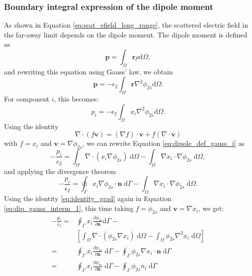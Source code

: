 \subsubsection{Boundary integral expression of the dipole moment}

As shown in Equation \eqref{eq:scat_efield_long_range}, the scattered electric 
field in the far-away limit depends on the dipole moment. The dipole moment is 
defined as 
%
\begin{equation} \label{eq:dipole_def}
\mathbf{p} = \int_\Omega \mathbf{r} \rho \text{d}\Omega,
\end{equation}
%
and rewriting this equation using Gauss' law, we obtain
%
\begin{equation} \label{eq:dipole_def_gauss}
\mathbf{p} = -\epsilon_2\int_\Omega \mathbf{r} \nabla^2 \phi_{2s} \text{d}\Omega.
\end{equation}
%
For component $i$, this becomes:
%
\begin{equation} \label{eq:dipole_def_gauss_i}
{p_i} = -\epsilon_2\int_\Omega {x_i} \nabla^2 \phi_{2s} \text{d}\Omega.
\end{equation}
%
Using the identity
%
\begin{equation} \label{eq:identity_grad}
  \nabla \cdot \left(f \mathbf{v}\right) = \left( \nabla f \right)\cdot \mathbf{v} + f\left(\nabla \cdot \mathbf{v}\right)
\end{equation}
%
with $f=x_i$ and $\mathbf{v} = \nabla\phi_{2s}$, we can rewrite Equation \eqref{eq:dipole_def_gauss_i}
as 
%
\begin{equation}
- \frac{p_i}{\epsilon_2} = \int_\Omega \nabla \cdot \left( x_i \nabla \phi_{2s} \right) \; \text{d}\Omega - \int_\Omega \nabla x_i \cdot \nabla\phi_{2s} \; \text{d}\Omega, \nonumber 
\end{equation}
\noindent and applying the divergence theorem
\begin{equation} \label{eq:dip_gauss_interm_1}
- \frac{p_i}{\epsilon_2}= \oint_\Gamma  x_i  \nabla \phi_{2s} \cdot \mathbf{n} \; \text{d}\Gamma - \int_\Omega \nabla x_i \cdot \nabla\phi_{2s} \; \text{d}\Omega.
\end{equation}
%
Using the identity \eqref{eq:identity_grad} again in Equation \eqref{eq:dip_gauss_interm_1}, this time 
taking $f=\phi_{2s}$ and $\mathbf{v} = \nabla x_i$, we get:
%
\begin{align} \label{eq:dip_gauss_interm_2}
 - \frac{p_i}{\epsilon_2} =& \oint_\Gamma  x_i  \frac{\partial \phi_{2s}}{\partial \mathbf{n}} \text{d}\Gamma - \nonumber \\
 & \left[ \int_\Omega \nabla \cdot \left( \phi_{2s} \nabla x_i \right)\;\text{d}\Omega - \int_\Omega  \phi_{2s} \nabla^2 x_i \;\text{d}\Omega\right] \nonumber\\
=& \oint_\Gamma  x_i  \frac{\partial \phi_{2s}}{\partial \mathbf{n}} \; \text{d}\Gamma - \oint_\Gamma \phi_{2s} \nabla x_i \cdot \mathbf{n} \; \text{d}\Gamma \nonumber \\
=& \oint_\Gamma  x_i  \frac{\partial \phi_{2s}}{\partial \mathbf{n}} \; \text{d}\Gamma - \oint_\Gamma \phi_{2s} n_i \;\text{d}\Gamma
\end{align}
